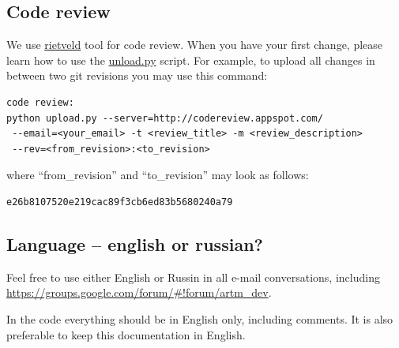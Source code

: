 \documentclass[11pt,a4paper,twoside]{report}
\begin{document}
\subsection{Code review}
\label{label:code_review}
We use
\href{https://code.google.com/p/rietveld/wiki/UploadPyUsage}{rietveld}
tool for code review.
When you have your first change, please learn how to use the
\href{http://codereview.appspot.com/static/upload.py}{unload.py} script.
For example, to upload all changes in between two git revisions you may use this command:
\begin{verbatim}
code review:
python upload.py --server=http://codereview.appspot.com/
 --email=<your_email> -t <review_title> -m <review_description>
 --rev=<from_revision>:<to_revision>
\end{verbatim}
where ``from\_revision'' and ``to\_revision'' may look as follows:
\begin{verbatim}
e26b8107520e219cac89f3cb6ed83b5680240a79
\end{verbatim}

\subsection{Language -- english or russian?}
Feel free to use either English or Russin in all e-mail conversations, including \url{https://groups.google.com/forum/#!forum/artm_dev}.

In the code everything should be in English only, including comments.
It is also preferable to keep this documentation in English.
\end{document}
